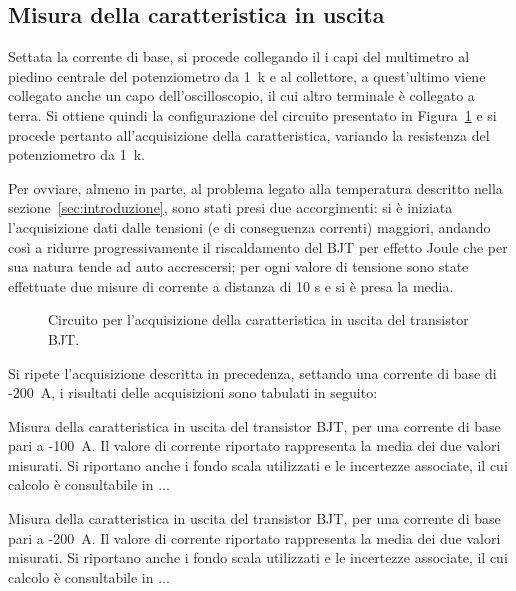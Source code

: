 \documentclass[../main.tex]{subfiles}
\begin{document}
    \subsection*{Misura della caratteristica in uscita}
    Settata la corrente di base, si procede collegando il i capi del multimetro al piedino
    centrale del potenziometro da 1~k\textohm\; e al collettore, a quest'ultimo
    viene collegato anche un capo dell'oscilloscopio, il cui altro terminale è collegato a terra.
    Si ottiene quindi la configurazione del circuito presentato in Figura~\ref{fig:circuito-caratteristica}
    e si procede pertanto all'acquisizione della caratteristica, variando la
    resistenza del potenziometro da 1~k\textohm.

    Per ovviare, almeno in parte, al problema legato alla
    temperatura descritto nella sezione~\ref{sec:introduzione},
    sono stati presi due accorgimenti:
    si è iniziata l'acquisizione dati dalle tensioni (e di
    conseguenza correnti) maggiori, andando così a ridurre
    progressivamente il riscaldamento del BJT per effetto Joule
    che per sua natura tende ad auto accrescersi;
    per ogni valore di tensione sono state effettuate due
    misure di corrente a distanza di 10 s e si è presa la media.

    \begin{figure}[ht]
        \centering
        
        \caption{Circuito per l'acquisizione della caratteristica in uscita del transistor BJT.}
        \label{fig:circuito-caratteristica}
    \end{figure}

    Si ripete l'acquisizione descritta in precedenza, settando una corrente di base
    di -200~\textmu A, i risultati delle acquisizioni sono tabulati in seguito:
    \clearpage
    \begin{table}[!ht]
        \centering
        
        \captionsetup{justification=centering} %
        \caption{Misura della caratteristica in uscita del transistor BJT, per una corrente di base pari a -100~\textmu A. Il
        valore di corrente riportato rappresenta la media dei due valori misurati. Si
        riportano anche i fondo scala utilizzati e le incertezze associate, il cui calcolo
        è consultabile in ...} %
        \label{tab:100uA}

    \end{table}
    \begin{table}[!ht]
        \centering
        
        \captionsetup{justification=centering} %
        \caption{Misura della caratteristica in uscita del transistor BJT, per una corrente di base pari a -200~\textmu A. Il
        valore di corrente riportato rappresenta la media dei due valori misurati. Si
        riportano anche i fondo scala utilizzati e le incertezze associate, il cui calcolo
        è consultabile in ...} %
        \label{tab:200uA}

    \end{table}
\end{document}

